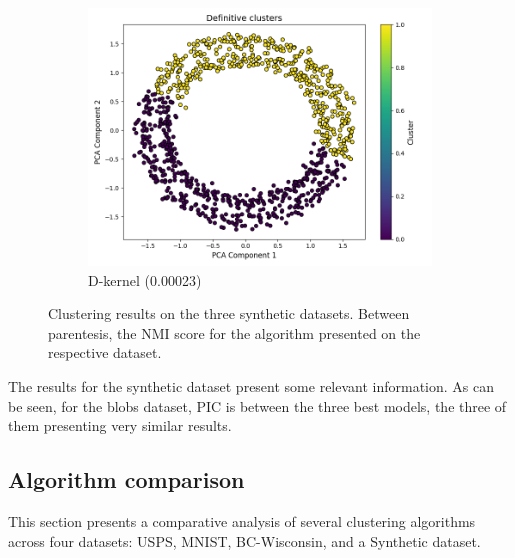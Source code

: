 \documentclass[
	10pt,
	parskip=half-,	
	paper=a4,
	english
	]{scrartcl}
\begin{document}
\begin{figure}[ht]
\begin{subfigure}[b]{0.3\textwidth}
        \includegraphics[width=\textwidth]{../data/plots/synthetic_noise_circles_circles_D-kernel_structural_0.png}
        \caption{D-kernel (0.00023)}
    \end{subfigure}

    \caption{Clustering results on the three synthetic datasets. Between parentesis, the NMI score for the algorithm presented on the respective dataset.}
    \label{fig:synthetic_results_grid}
\end{figure}

The results for the synthetic dataset present some relevant information. As can be seen, for the blobs dataset, PIC is between the three best models, the three of them presenting very similar results.

\subsection{Algorithm comparison}

This section presents a comparative analysis of several clustering algorithms across four datasets: USPS, MNIST, BC-Wisconsin, and a Synthetic dataset.
\end{document}
